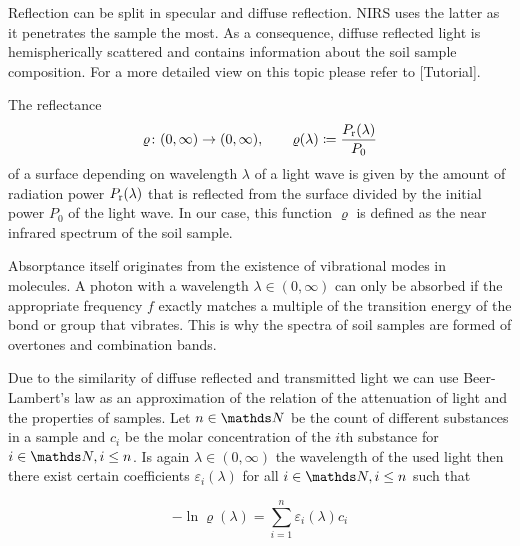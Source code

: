 		Reflection can be split in specular and diffuse reflection.
		NIRS uses the latter as it penetrates the sample the most.
		As a consequence, diffuse reflected light is hemispherically scattered and contains information about the soil sample composition.
		For a more detailed view on this topic please refer to [Tutorial].

		The reflectance 
		\[
			\varrho\colon(0,\infty)\to(0,\infty),\qquad \varrho(\lambda) \coloneqq \frac{P_{\mathrm{r}}(\lambda)}{P_0}
		\]
		of a surface depending on wavelength $\lambda$ of a light wave is given by the amount of radiation power $P_{\mathrm{r}}(\lambda)$ that is reflected from the surface divided by the initial power $P_0$ of the light wave.	
		In our case, this function $\varrho$ is defined as the near infrared spectrum of the soil sample.

		Absorptance itself originates from the existence of vibrational modes in molecules.
		A photon with a wavelength $\lambda \in (0,\infty)$ can only be absorbed if the appropriate frequency $f$ exactly matches a multiple of the transition energy of the bond or group that vibrates.%
		This is why the spectra of soil samples are formed of overtones and combination bands.

		Due to the similarity of diffuse reflected and transmitted light we can use Beer-Lambert's law as an approximation of the relation of the attenuation of light and the properties of samples.
		Let $n\in\SN$ be the count of different substances in a sample and $c_i$ be the molar concentration of the $i$th substance for $i\in\SN,i\leq n$.
		Is again $\lambda \in (0,\infty)$ the wavelength of the used light then there exist certain coefficients $\varepsilon_i(\lambda)$ for all $i\in\SN,i\leq n$ such that

		\[
			-\ln \varrho(\lambda) = \sum_{i=1}^{n} \varepsilon_i(\lambda) c_i
		\]


